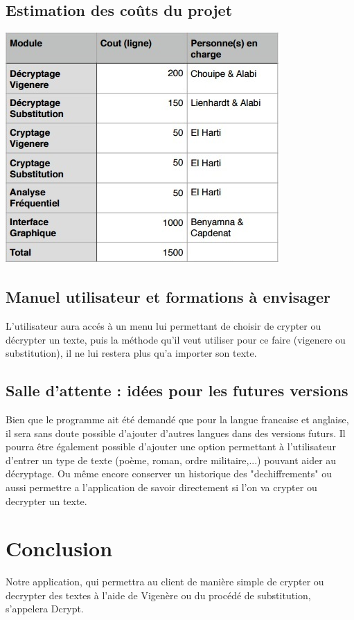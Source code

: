 \documentclass[a4]{article}
\begin{document}
		\subsection{Estimation des coûts du projet}
		\begin{center}\includegraphics[scale=0.5]{Tableau_cout.jpg}\end{center} 
		\subsection{Manuel utilisateur et formations à envisager}
			L'utilisateur aura accés à un menu lui permettant de choisir de crypter ou décrypter un texte,
			puis la méthode qu'il veut utiliser pour ce faire (vigenere ou substitution), il ne lui restera 
			plus qu'a importer son texte.
		\subsection{Salle d’attente : idées pour les futures versions}
			Bien que le programme ait été demandé que pour la langue francaise et anglaise, 
			il sera sans doute possible d'ajouter d'autres langues dans des versions futurs. 
			Il pourra être également possible d'ajouter une option permettant à l'utilisateur
			d'entrer un type de texte (poème, roman, ordre militaire,...) pouvant aider au décryptage. Ou même encore conserver un historique des "dechiffrements" ou aussi permettre a l'application de savoir directement si l'on va crypter ou decrypter un texte.
		
		\section{Conclusion}
			Notre application, qui permettra au client de manière simple de crypter ou decrypter des textes
			à l'aide de Vigenère ou du procédé de substitution, s'appelera Dcrypt. 
			
\end{document}
